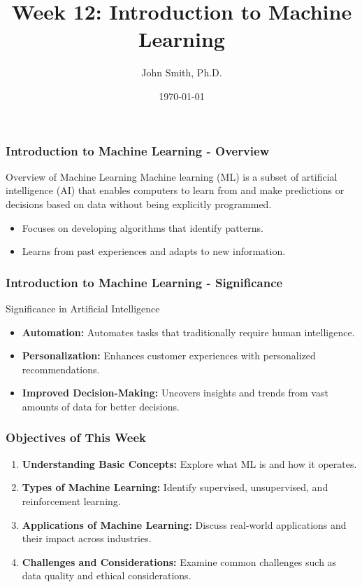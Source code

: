 \documentclass[aspectratio=169]{beamer}
\title[Introduction to Machine Learning]{Week 12: Introduction to Machine Learning}
\author[J. Smith]{John Smith, Ph.D.}
\institute[University Name]{
  Department of Computer Science\\
  University Name\\
  \vspace{0.3cm}
  Email: email@university.edu\\
  Website: www.university.edu
}
\date{\today}
\begin{document}
\frame{\titlepage}

\begin{frame}[fragile]
    \frametitle{Introduction to Machine Learning - Overview}
    \begin{block}{Overview of Machine Learning}
        Machine learning (ML) is a subset of artificial intelligence (AI) that enables computers to learn from and make predictions or decisions based on data without being explicitly programmed. 
    \end{block}
    
    \begin{itemize}
        \item Focuses on developing algorithms that identify patterns.
        \item Learns from past experiences and adapts to new information.
    \end{itemize}
\end{frame}

\begin{frame}[fragile]
    \frametitle{Introduction to Machine Learning - Significance}
    \begin{block}{Significance in Artificial Intelligence}
        \begin{itemize}
            \item \textbf{Automation:} Automates tasks that traditionally require human intelligence.
            \item \textbf{Personalization:} Enhances customer experiences with personalized recommendations.
            \item \textbf{Improved Decision-Making:} Uncovers insights and trends from vast amounts of data for better decisions.
        \end{itemize}
    \end{block}
\end{frame}

\begin{frame}[fragile]
    \frametitle{Objectives of This Week}
    \begin{enumerate}
        \item \textbf{Understanding Basic Concepts:} Explore what ML is and how it operates.
        \item \textbf{Types of Machine Learning:} Identify supervised, unsupervised, and reinforcement learning.
        \item \textbf{Applications of Machine Learning:} Discuss real-world applications and their impact across industries.
        \item \textbf{Challenges and Considerations:} Examine common challenges such as data quality and ethical considerations.
    \end{enumerate}
\end{frame}
\end{document}
